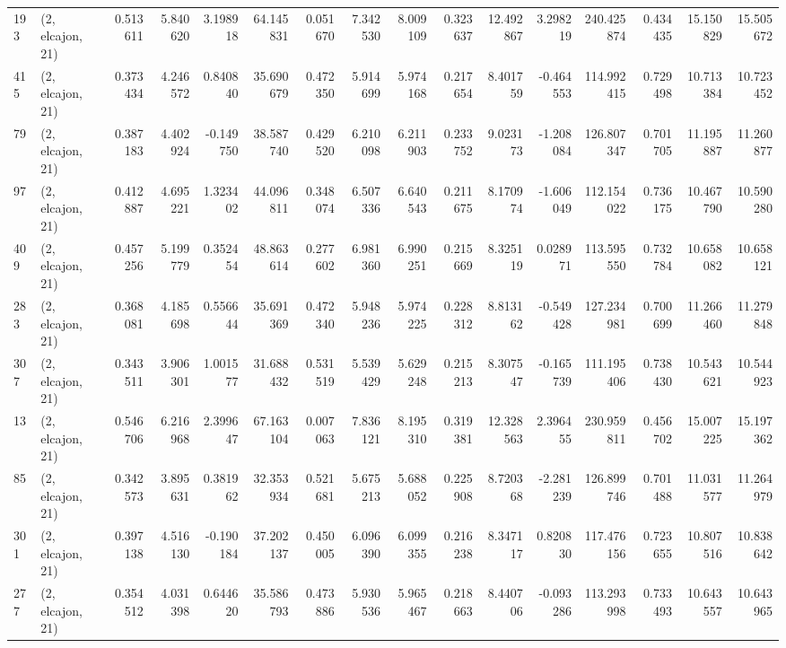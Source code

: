 \begin{tabular}{llrrrrrrrrrrrrrr}
193 &  (2, elcajon, 21) &   0.513611 &   5.840620 &   3.198918 &    64.145831 &   0.051670 &   7.342530 &   8.009109 &  0.323637 &  12.492867 &   3.298219 &   240.425874 &   0.434435 &  15.150829 &  15.505672 \\
415 &  (2, elcajon, 21) &   0.373434 &   4.246572 &   0.840840 &    35.690679 &   0.472350 &   5.914699 &   5.974168 &  0.217654 &   8.401759 &  -0.464553 &   114.992415 &   0.729498 &  10.713384 &  10.723452 \\
79  &  (2, elcajon, 21) &   0.387183 &   4.402924 &  -0.149750 &    38.587740 &   0.429520 &   6.210098 &   6.211903 &  0.233752 &   9.023173 &  -1.208084 &   126.807347 &   0.701705 &  11.195887 &  11.260877 \\
97  &  (2, elcajon, 21) &   0.412887 &   4.695221 &   1.323402 &    44.096811 &   0.348074 &   6.507336 &   6.640543 &  0.211675 &   8.170974 &  -1.606049 &   112.154022 &   0.736175 &  10.467790 &  10.590280 \\
409 &  (2, elcajon, 21) &   0.457256 &   5.199779 &   0.352454 &    48.863614 &   0.277602 &   6.981360 &   6.990251 &  0.215669 &   8.325119 &   0.028971 &   113.595550 &   0.732784 &  10.658082 &  10.658121 \\
283 &  (2, elcajon, 21) &   0.368081 &   4.185698 &   0.556644 &    35.691369 &   0.472340 &   5.948236 &   5.974225 &  0.228312 &   8.813162 &  -0.549428 &   127.234981 &   0.700699 &  11.266460 &  11.279848 \\
307 &  (2, elcajon, 21) &   0.343511 &   3.906301 &   1.001577 &    31.688432 &   0.531519 &   5.539429 &   5.629248 &  0.215213 &   8.307547 &  -0.165739 &   111.195406 &   0.738430 &  10.543621 &  10.544923 \\
13  &  (2, elcajon, 21) &   0.546706 &   6.216968 &   2.399647 &    67.163104 &   0.007063 &   7.836121 &   8.195310 &  0.319381 &  12.328563 &   2.396455 &   230.959811 &   0.456702 &  15.007225 &  15.197362 \\
85  &  (2, elcajon, 21) &   0.342573 &   3.895631 &   0.381962 &    32.353934 &   0.521681 &   5.675213 &   5.688052 &  0.225908 &   8.720368 &  -2.281239 &   126.899746 &   0.701488 &  11.031577 &  11.264979 \\
301 &  (2, elcajon, 21) &   0.397138 &   4.516130 &  -0.190184 &    37.202137 &   0.450005 &   6.096390 &   6.099355 &  0.216238 &   8.347117 &   0.820830 &   117.476156 &   0.723655 &  10.807516 &  10.838642 \\
277 &  (2, elcajon, 21) &   0.354512 &   4.031398 &   0.644620 &    35.586793 &   0.473886 &   5.930536 &   5.965467 &  0.218663 &   8.440706 &  -0.093286 &   113.293998 &   0.733493 &  10.643557 &  10.643965 \\

\end{tabular}

